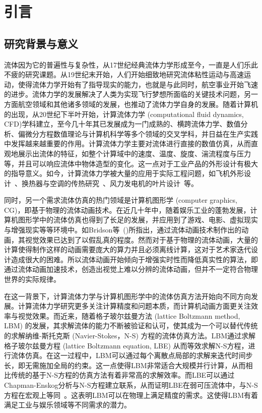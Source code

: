 \chapter{引言}

\section{研究背景与意义}
流体因为它的普遍性与复杂性，从17世纪经典流体力学形成至今，一直是人们乐此不疲的研究课题。从19世纪末开始，人们开始细致地研究流体粘性运动与高速运动，使得流体力学开始有了指导现实的能力，也就是与此同时，航空事业开始飞速的进步。流体力学的发展解决了人类为实现飞行梦想所面临的关键技术问题，另一方面航空领域和其他诸多领域的发展，也推动了流体力学自身的发展。随着计算机的出现，从20世纪下半叶开始，计算流体力学 (computational fluid dynamics, CFD)学科建立，至今几十年其已发展成为一门成熟的、横跨流体力学、数值分析、偏微分方程数值理论与计算机科学等多个领域的交叉学科，并日益在生产实践中发挥越来越重要的作用。计算流体力学主要对流体进行直接的数值仿真，从而直观地展示出流体的特征，如整个计算域中的速度、温度、旋度、湍流程度与压力等，并且可以响应流体中物体造型的变化。这一点对于工业产品的外形设计有极大的指导意义。如今，计算流体力学被大量的应用于实际工程问题，如飞机外形设计~\cite{JOHNSON20051115}、换热器与空调的传热研究~\cite{ASLAMBHUTTA20121}、风力发电机的叶片设计~\cite{Shourangiz-Haghighi2020-mo}等。

同时，另一个需求流体仿真的热门领域是计算机图形学 (computer graphics, CG)，即基于物理的流体动画技术。在近几十年中，随着娱乐工业的蓬勃发展，计算机图形学中的流体仿真也得到了长足的发展，并应用到了游戏、电影、虚拟现实与增强现实等等环境中。如Bridson等~(\citeyear{doi:10.1126/science.1198769})所指出，通过流体动画技术制作出的动画，其视觉效果已达到了以假乱真的程度。然而对于基于物理的流体动画，大量的计算使得制作这样的动画需要庞大的算力并且必须离线计算，这对于艺术家迭代设计造成很大的困难。所以流体动画开始倾向于增强实时性而降低真实性的算法，即通过流体动画加速技术，创造出视觉上难以分辨的流体动画，但并不一定符合物理世界的实际规律。

在这一背景下，计算流体力学与计算机图形学中的流体仿真方法开始向不同方向发展。计算流体力学研究更多关注计算精度和问题本质，而计算机动画方面更关注效率与视觉效果。而近来，随着格子玻尔兹曼方法 (lattice Boltzmann method, LBM) 的发展，其求解流体的能力不断被验证和认可，使其成为一个可以替代传统的求解纳维-斯托克斯 (Navier-Stokes，N-S) 方程的流体仿真方法。LBM通过求解格子玻尔兹曼方程 (lattice Boltzmann equation, LBE) 从而等效求解N-S方程，进行流体仿真。在这一过程中，LBM可以通过每个离散点局部的求解来迭代时间步长，即无需施加全局的约束。这一点使得LBM非常适合大规模并行计算，从而相比传统的基于N-S方程的仿真方法有着非常高的求解效率。而LBE可以通过Chapman-Enskog分析与N-S方程建立联系，从而证明LBE在弱可压流体中，与N-S方程在宏观上等同~\cite{Y.H.Qian_1993}。这表明LBM可以在物理上满足精度的需求。这使得LBM有着满足工业与娱乐领域等不同需求的潜力。

